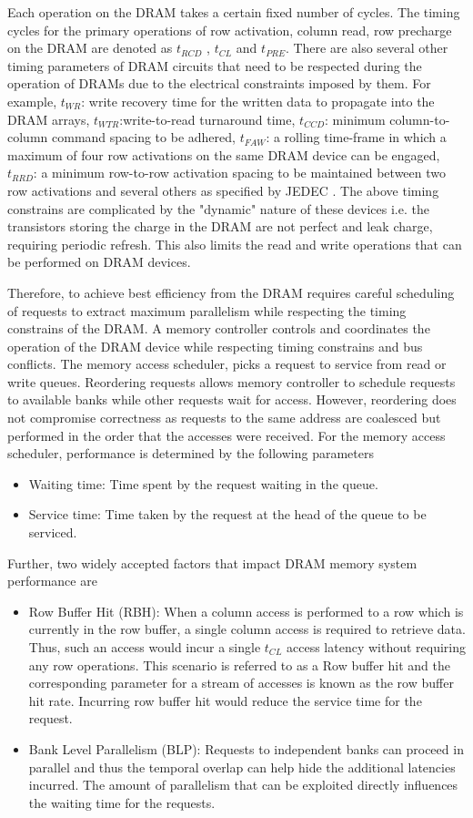 \par Each operation on the DRAM takes a certain fixed number of cycles. The timing cycles for the primary operations of row activation, column read, row precharge on the DRAM are denoted as $t_{RCD}$ , $t_{CL}$ and $t_{PRE}$. There are also several other timing parameters of DRAM circuits that need to be respected during the operation of DRAMs due to the electrical constraints imposed by them. For example, $t_{WR}$: write recovery time for the written data to propagate into the DRAM arrays, $t_{WTR}$:write-to-read turnaround time, $t_{CCD}$: minimum column-to-column command spacing to be adhered, $t_{FAW}$: a rolling time-frame in which a maximum of four row activations on the same DRAM device can be engaged, $t_{RRD}$: a minimum row-to-row activation spacing to be maintained between two row activations and several others as specified by JEDEC \cite{jedec-ddr3}. The above timing constrains are complicated by the "dynamic" nature of these devices i.e. the transistors storing the charge in the DRAM are not perfect and leak charge, requiring periodic refresh. This also limits the read and write operations that can be performed on DRAM devices.
\par Therefore, to achieve best efficiency from the DRAM requires careful scheduling of requests to extract maximum parallelism while respecting the timing constrains of the DRAM. A memory controller controls and coordinates the operation of the DRAM device while respecting timing constrains and bus conflicts. The memory access scheduler, picks a request to service from read or write queues. Reordering requests allows memory controller to schedule requests to available banks while other requests wait for access. However, reordering does not compromise correctness as requests to the same address are coalesced but performed in the order that the accesses were received. For the memory access scheduler, performance is determined by the following parameters
\begin{itemize}
	\item Waiting time: Time spent by the request waiting in the queue.
	\item Service time: Time taken by the request at the head of the queue to be serviced.
\end{itemize}
Further, two widely accepted factors that impact DRAM memory system performance are
\begin{itemize}
	\item Row Buffer Hit (RBH): When a column access is performed to a row which is currently in the row buffer, a single column access is required to retrieve data. Thus, such an access would incur a single $t_{CL}$ access latency without requiring any row operations. This scenario is referred to as a Row buffer hit and the corresponding parameter for a stream of accesses is known as the row buffer hit rate. Incurring row buffer hit would reduce the service time for the request. 
	\item Bank Level Parallelism (BLP): Requests to independent banks can proceed in parallel and thus the temporal overlap can help hide the additional latencies incurred. The amount of parallelism that can be exploited directly influences the waiting time for the requests.
\end{itemize}

